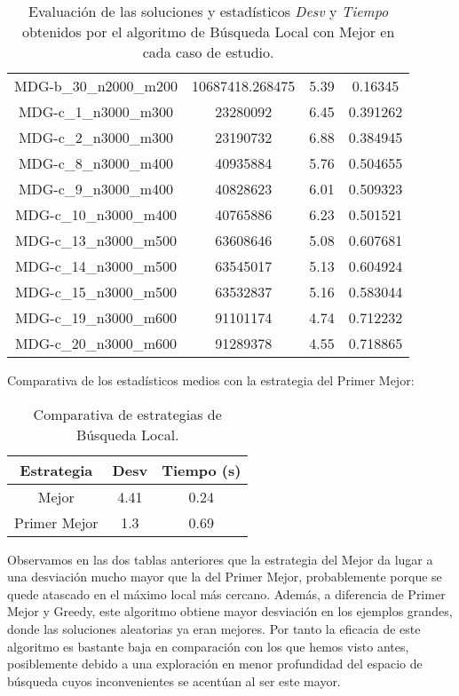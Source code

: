 \documentclass{article}
\begin{document}
\begin{table}[H]
\begin{tabular}{|cccc|}
		MDG-b\_30\_n2000\_m200 & 10687418.268475 & 5.39 & 0.16345\\
		MDG-c\_1\_n3000\_m300 & 23280092 & 6.45 & 0.391262\\
		MDG-c\_2\_n3000\_m300 & 23190732 & 6.88 & 0.384945\\
		MDG-c\_8\_n3000\_m400 & 40935884 & 5.76 & 0.504655\\
		MDG-c\_9\_n3000\_m400 & 40828623 & 6.01 & 0.509323\\
		MDG-c\_10\_n3000\_m400 & 40765886 & 6.23 & 0.501521\\
		MDG-c\_13\_n3000\_m500 & 63608646 & 5.08 & 0.607681\\
		MDG-c\_14\_n3000\_m500 & 63545017 & 5.13 & 0.604924\\
		MDG-c\_15\_n3000\_m500 & 63532837 & 5.16 & 0.583044\\
		MDG-c\_19\_n3000\_m600 & 91101174 & 4.74 & 0.712232\\
		MDG-c\_20\_n3000\_m600 & 91289378 & 4.55 & 0.718865\\
		\hline
	\end{tabular}
	\caption{Evaluación de las soluciones y estadísticos \emph{Desv} y \emph{Tiempo} obtenidos por el algoritmo de Búsqueda Local
		con Mejor en cada caso de estudio.}
	\label{tab:bs-mejor}
\end{table}


Comparativa de los estadísticos medios con la estrategia del Primer Mejor:

\begin{table}[H]
	\centering
	\begin{tabular}{|ccc|}
		\hline
		Estrategia & Desv & Tiempo (s)\\ \hline
		Mejor & 4.41 & 0.24 \\
		Primer Mejor & 1.3 & 0.69 \\
		\hline
	\end{tabular}
	\caption{Comparativa de estrategias de Búsqueda Local.}
	\label{tab:comparativa-bs}
\end{table}

Observamos en las dos tablas anteriores que la estrategia del Mejor da lugar a una desviación mucho mayor que la del Primer Mejor,
probablemente porque se quede atascado en el máximo local más cercano. Además, a diferencia de Primer Mejor y Greedy, este algoritmo
obtiene mayor desviación en los ejemplos grandes, donde las soluciones aleatorias ya eran mejores. Por tanto la eficacia de este
algoritmo es bastante baja en comparación con los que hemos visto antes, posiblemente debido a una exploración en menor profundidad
del espacio de búsqueda cuyos inconvenientes se acentúan al ser este mayor.
\end{document}
